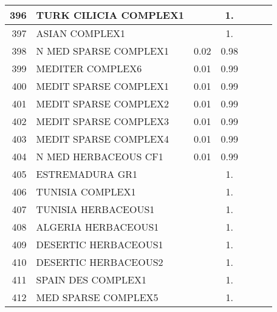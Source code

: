 {{\begin{tabular}{||r|l||c|c|c|c|c||}
 \hline
         396  & TURK CILICIA COMPLEX1                                        &       &  1.   &       &       \\
 \hline
         397  & ASIAN COMPLEX1                                               &       &  1.   &       &       \\
 \hline
         398  & N MED SPARSE COMPLEX1                                        &  0.02 &  0.98 &       &       \\
 \hline
         399  & MEDITER COMPLEX6                                             &  0.01 &  0.99 &       &       \\
 \hline
         400  & MEDIT SPARSE COMPLEX1                                        &  0.01 &  0.99 &       &       \\
 \hline
         401  & MEDIT SPARSE COMPLEX2                                        &  0.01 &  0.99 &       &       \\
 \hline
         402  & MEDIT SPARSE COMPLEX3                                        &  0.01 &  0.99 &       &       \\
 \hline
         403  & MEDIT SPARSE COMPLEX4                                        &  0.01 &  0.99 &       &       \\
 \hline
         404  & N MED HERBACEOUS CF1                                         &  0.01 &  0.99 &       &       \\
 \hline
         405  & ESTREMADURA GR1                                              &       &  1.   &       &       \\
 \hline
         406  & TUNISIA COMPLEX1                                             &       &  1.   &       &       \\
 \hline
         407  & TUNISIA HERBACEOUS1                                          &       &  1.   &       &       \\
 \hline
         408  & ALGERIA HERBACEOUS1                                          &       &  1.   &       &       \\
 \hline
         409  & DESERTIC HERBACEOUS1                                         &       &  1.   &       &       \\
 \hline
         410  & DESERTIC HERBACEOUS2                                         &       &  1.   &       &       \\
 \hline
         411  & SPAIN DES COMPLEX1                                           &       &  1.   &       &       \\
 \hline
         412  & MED SPARSE COMPLEX5                                          &       &  1.   &       &       \\

\end{tabular}}}
